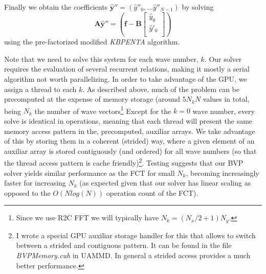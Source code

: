 \documentclass[ twoside,openright,titlepage,numbers=noenddot,%
headinclude,footinclude,cleardoublepage=empty,abstract=on,
BCOR=5mm,paper=b5,fontsize=11pt, dvipsnames
]{scrreprt}
\newcommand{\uammd}{\gls{UAMMD}\xspace}
\newcommand{\gpu}{\gls{GPU}\xspace}
\newcommand{\fou}[1]{\widehat{#1}}
\begin{document}
Finally we obtain the coefficients $\fou{\bm{y}}''=(\fou{y}''_0, \dots \fou{y}''_{N-1})$ by solving
\begin{equation}
\bm{A}\fou{\bm{y}}''=\left(\bm{f}-\bm{B}\begin{bmatrix}   \fou{y}_0 \\ \fou{y}'_0\\ \end{bmatrix}\right)
\end{equation}
using the pre-factorized modified \emph{KBPENTA} algorithm.

Note that we need to solve this system for each wave number, $k$. Our solver requires the evaluation of several recurrent relations, making it mostly a serial algorithm not worth parallelizing. In order to take advantage of the \gpu, we assign a thread to each $k$. As described above, much of the problem can be precomputed at the expense of memory storage (around $5N_kN$ values in total, being $N_k$ the number of wave vectors\footnote{Since we use R2C \gls{FFT} we will typically have $N_k=(N_x/2+1)N_y$.}
Except for the $k=0$ wave number, every solve is identical in operations, meaning that each thread will present the same memory access pattern in the, precomputed, auxiliar arrays. We take advantage of this by storing them in a coherent (strided) way, where a given element of an auxiliar array is stored contiguously (and ordered) for all wave numbers (so that the thread access pattern is cache friendly)\footnote{I wrote a special \gpu auxiliar storage handler for this that allows to switch between a strided and contiguous pattern. It can be found in the file \emph{BVPMemory.cuh} in \uammd. In general a strided access provides a much better performance.}. Testing suggests that our \gls{BVP} solver yields similar performance as the \gls{FCT} for small $N_k$, becoming increasingly faster for increasing $N_k$ (as expected given that our solver has linear scaling as opposed to the $O(Nlog(N))$ operation count of the \gls{FCT}).

%
%
\end{document}
